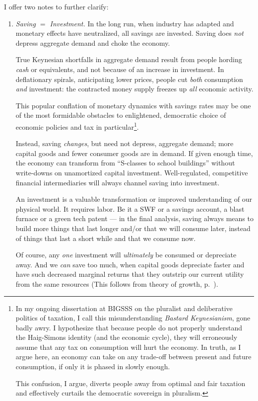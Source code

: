 I offer two notes to further clarify:
\begin{enumerate}
	\item \emph{Saving $=$ Investment.} In the long run, when industry has adapted and monetary effects have neutralized, all savings are invested. Saving does \emph{not} depress aggregate demand and choke the economy.
	
	True Keynesian shortfalls in aggregate demand result from people hording \emph{cash} or equivalents, and not because of an increase in investment. In deflationary spirals, anticipating lower prices, people cut \emph{both} consumption \emph{and} investment: the contracted money supply freezes up \emph{all} economic activity. 
	
	This popular conflation of monetary dynamics with savings rates may be one of the most formidable obstacles to enlightened, democratic choice of economic policies and tax in particular\footnote{
		In my ongoing dissertation at \gls{BIGSSS} on the pluralist and deliberative politics of taxation, I call this misunderstanding \emph{Bastard Keynesianism}, gone badly awry. I hypothesize that because people do not properly understand the Haig-Simons identity (and the economic cycle), they will erroneously assume that any tax on consumption will hurt the economy. In truth, as I argue here, an economy can take on any trade-off between present and future consumption, if only it is phased in slowly enough.
		
		This confusion, I argue, diverts people away from optimal and fair taxation and effectively curtails the democratic sovereign in pluralism.}.
	
	Instead, saving \emph{changes}, but need not depress, aggregate demand; more capital goods and fewer consumer goods are in demand. If given enough time, the economy can transform from ``S-classes to school buildings'' without write-downs on unamortized capital investment. Well-regulated, competitive financial intermediaries will always channel saving into investment. 
	
	An investment is a valuable transformation or improved understanding of our physical world. It requires labor. Be it a \gls{SWF} or a savings account, a blast furnace or a green tech patent --- in the final analysis, saving always means to build more things that last longer and/or that we will consume later, instead of things that last a short while and that we consume now. 
	
	Of course, any \emph{one} investment will \emph{ultimately} be consumed or depreciate away. And we \emph{can} save too much, when capital goods depreciate faster and have such decreased marginal returns that they outstrip our current utility from the same resources (This follows from \cite{Solow1956} theory of growth, p.~\pageref{sec:time}).
	

\end{enumerate}

